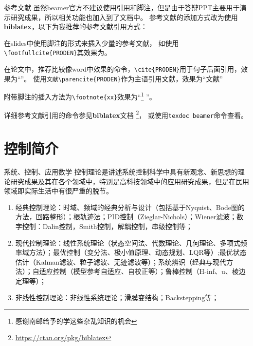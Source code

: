 \documentclass[10pt]{ctexbeamer}
\begin{document}
\begin{frame}[fragile=singleslide]{参考文献}
    虽然beamer官方不建议使用引用和脚注，但是由于答辩PPT主要用于演示研究成果，所以相关功能也加入到了文档中。
    参考文献的添加方式改为使用\textbf{biblatex}，以下为我推荐的参考文献引用方式：

    在slides中使用脚注的形式来插入少量的参考文献，
    如使用\verb|\footfullcite{PRODEN}|其效果为。

    在论文中，推荐比较像word中效果的命令，\verb|\cite{PRODEN}|用于句子后面引用，效果为“\cite{PRODEN}”。
    使用\verb|文献\parencite{PRODEN}|作为主语引用文献，效果为“文献\parencite{PRODEN}”

    附带脚注的插入方法为\verb|\footnote{xx}|效果为“\footnote{感谢南邮给予的学这些杂乱知识的机会} ”。

    详细参考文献引用的命令参见\textbf{biblatex}文档 \footnote{\url{https://ctan.org/pkg/biblatex}}，
    或使用\verb|texdoc beamer|命令查看。
    
\end{frame}

\section{控制简介}

\begin{frame}{系统、控制、应用数学}
  控制理论是讲述系统控制科学中具有新观念、新思想的理论研究成果及其在各个领域中，特别是高科技领域中的应用研究成果，但是在民用领域即实际生活中有很严重的脱节。
\end{frame}

\begin{frame}{}
  \begin{enumerate}
    \item 经典控制理论：时域、频域的经典分析与设计（包括基于Nyquist、Bode图的方法，回路整形）；根轨迹法；PID控制（Zieglar-Nichols）；Wiener滤波；数字控制：Dalin控制，Smith控制，解耦控制，串级控制等；
    \item 现代控制理论：线性系统理论（状态空间法、代数理论、几何理论、多项式频率域方法）；最优控制（变分法、极小值原理、动态规划、LQR等）;最优状态估计（Kalman滤波、粒子滤波、无迹滤波等）；系统辨识（经典与现代方法）；自适应控制（模型参考自适应、自校正等）；鲁棒控制（H-inf、u、棱边定理等）；
    \item 非线性控制理论：非线性系统理论；滑膜变结构；Backstepping等；
  \end{enumerate}
\end{frame}
\end{document}
